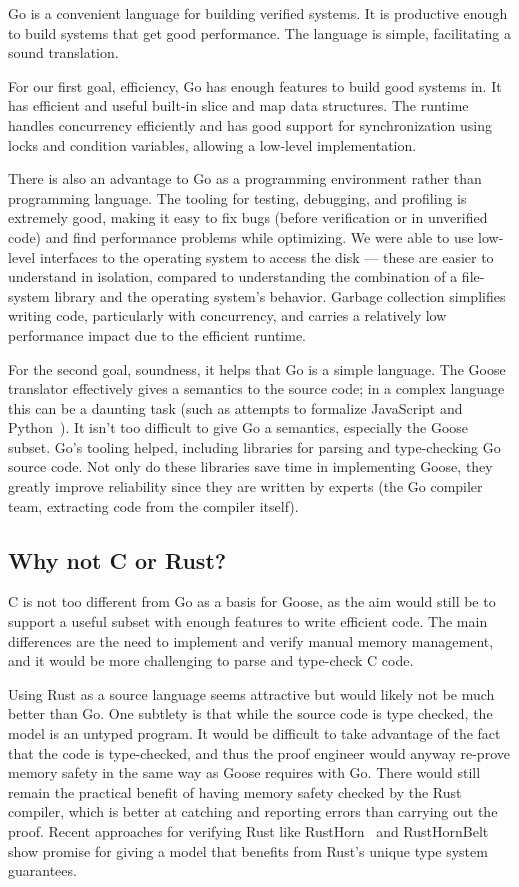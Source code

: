Go is a convenient language for building verified systems. It is productive
enough to build systems that get good performance. The language is simple,
facilitating a sound translation.

For our first goal, efficiency, Go has enough features to build good systems
in. It has efficient and useful built-in slice and map data structures. The
runtime handles concurrency efficiently and has good support for synchronization
using locks and condition variables, allowing a low-level implementation.

There is also an advantage to Go as a programming environment rather than
programming language. The tooling for testing, debugging, and profiling is
extremely good, making it easy to fix bugs (before verification or in unverified
code) and find performance problems while optimizing. We were able to use
low-level interfaces to the operating system to access the disk --- these are
easier to understand in isolation, compared to understanding the combination of
a file-system library and the operating system's behavior. Garbage collection
simplifies writing code, particularly with concurrency, and carries a relatively
low performance impact due to the efficient runtime.

For the second goal, soundness, it helps that Go is a simple language. The Goose
translator effectively gives a semantics to the source code; in a complex
language this can be a daunting task (such as attempts to formalize JavaScript and
Python~\cite{guha:lambda-js,politz:python-semantics}). It isn't too
difficult to give Go a semantics, especially the Goose subset. Go's tooling
helped, including libraries for parsing and type-checking Go source code. Not
only do these libraries save time in implementing Goose, they greatly improve
reliability since they are written by experts (the Go compiler team, extracting
code from the compiler itself).

\subsection{Why not C or Rust?}

C is not too different from Go as a basis for Goose, as the aim would still be
to support a useful subset with enough features to write efficient code. The main differences are
the need to implement and verify manual memory management, and it would be more
challenging to parse and type-check C code.

Using Rust as a source language seems attractive but would likely not be much
better than Go. One subtlety is that while the source code is type checked, the
model is an untyped program. It would be difficult to take advantage of the fact
that the code is type-checked, and thus the proof engineer would anyway
re-prove memory safety in the same way as Goose requires with Go. There would
still remain the practical benefit of having memory safety checked by the Rust
compiler, which is better at catching and reporting errors than carrying out the
proof. Recent approaches for verifying Rust like
RustHorn~\cite{matsushita:rusthorn} and
RustHornBelt~\cite{matsushita:rusthornbelt} show promise for giving a model that
benefits from Rust's unique type system guarantees.

